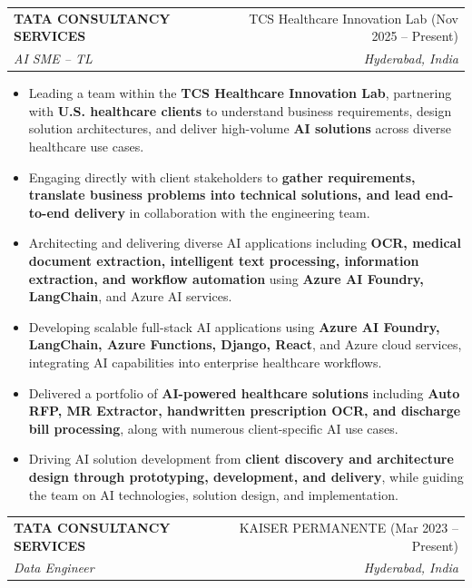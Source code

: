 \documentclass[letterpaper,11pt]{article}
\makeatletter
\newcommand{\resumeItem}[1]{
  \item\small{
    {#1 \vspace{-2pt}}
  }
}
\newcommand{\resumeSubheading}[4]{
  \vspace{-2pt}\item
    \begin{tabular*}{0.97\textwidth}[t]{l@{\extracolsep{\fill}}r}
      \textbf{#1} & #2 \\
      \textit{\small#3} & \textit{\small #4} \\
    \end{tabular*}\vspace{-7pt}
}
\newcommand{\resumeItemListStart}{\begin{itemize}}
\newcommand{\resumeItemListEnd}{\end{itemize}\vspace{-5pt}}
\makeatother
\begin{document}
  \resumeSubheading
    {TATA CONSULTANCY SERVICES}{TCS Healthcare Innovation Lab (Nov 2025 -- Present)}
    {AI SME -- TL}{Hyderabad, India}
    \resumeItemListStart
      \resumeItem{Leading a team within the \textbf{TCS Healthcare Innovation Lab}, partnering with \textbf{U.S. healthcare clients} to understand business requirements, design solution architectures, and deliver high-volume \textbf{AI solutions} across diverse healthcare use cases.}
      \resumeItem{Engaging directly with client stakeholders to \textbf{gather requirements, translate business problems into technical solutions, and lead end-to-end delivery} in collaboration with the engineering team.}
      \resumeItem{Architecting and delivering diverse AI applications including \textbf{OCR, medical document extraction, intelligent text processing, information extraction, and workflow automation} using \textbf{Azure AI Foundry, LangChain}, and Azure AI services.}
      \resumeItem{Developing scalable full-stack AI applications using \textbf{Azure AI Foundry, LangChain, Azure Functions, Django, React}, and Azure cloud services, integrating AI capabilities into enterprise healthcare workflows.}
      \resumeItem{Delivered a portfolio of \textbf{AI-powered healthcare solutions} including \textbf{Auto RFP, MR Extractor, handwritten prescription OCR, and discharge bill processing}, along with numerous client-specific AI use cases.}
      \resumeItem{Driving AI solution development from \textbf{client discovery and architecture design through prototyping, development, and delivery}, while guiding the team on AI technologies, solution design, and implementation.}
    \resumeItemListEnd



  \resumeSubheading
    {TATA CONSULTANCY SERVICES}{KAISER PERMANENTE (Mar 2023 -- Present)}
    {Data Engineer}{Hyderabad, India}
\end{document}
